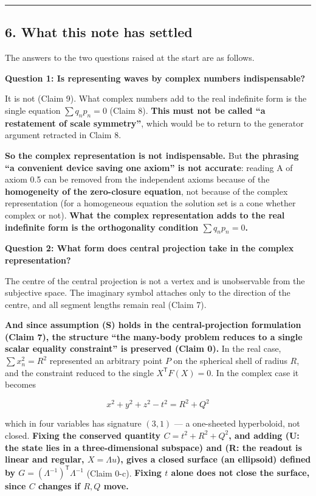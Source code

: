 \documentclass[
  10pt,
]{article}
\begin{document}
\begin{center}\rule{0.5\linewidth}{0.5pt}\end{center}

\subsection{6. What this note has
settled}\label{what-this-note-has-settled}

The answers to the two questions raised at the start are as follows.

\textbf{Question 1: Is representing waves by complex numbers
indispensable?}

It is not (Claim 9). What complex numbers add to the real indefinite
form is the single equation \(\sum q_np_n=0\) (Claim 8). \textbf{This
must not be called ``a restatement of scale symmetry''}, which would be
to return to the generator argument retracted in Claim 8.

\textbf{So the complex representation is not indispensable.} But
\textbf{the phrasing ``a convenient device saving one axiom'' is not
accurate}: reading A of axiom 0.5 can be removed from the independent
axioms because of the \textbf{homogeneity of the zero-closure equation},
not because of the complex representation (for a homogeneous equation
the solution set is a cone whether complex or not). \textbf{What the
complex representation adds to the real indefinite form is the
orthogonality condition \(\sum q_np_n=0\).}

\textbf{Question 2: What form does central projection take in the
complex representation?}

The centre of the central projection is not a vertex and is unobservable
from the subjective space. The imaginary symbol attaches only to the
direction of the centre, and all segment lengths remain real (Claim 7).

\textbf{And since assumption (S) holds in the central-projection
formulation (Claim 7), the structure ``the many-body problem reduces to
a single scalar equality constraint'' is preserved (Claim 0).} In the
real case, \(\sum x_n^2 = R^2\) represented an arbitrary point \(P\) on
the spherical shell of radius \(R\), and the constraint reduced to the
single \(X^{\mathsf T}F(X)=0\). In the complex case it becomes

\[x^2 + y^2 + z^2 - t^2 = R^2 + Q^2\]

which in four variables has signature \((3,1)\) --- a one-sheeted
hyperboloid, not closed. \textbf{Fixing the conserved quantity
\(C = t^2+R^2+Q^2\), and adding (U: the state lies in a
three-dimensional subspace) and (R: the readout is linear and regular,
\(X=\Lambda u\)), gives a closed surface (an ellipsoid) defined by
\(G=(\Lambda^{-1})^{\mathsf T}\Lambda^{-1}\)} (Claim 0-c).
\textbf{Fixing \(t\) alone does not close the surface, since \(C\)
changes if \(R,Q\) move.}
\end{document}
